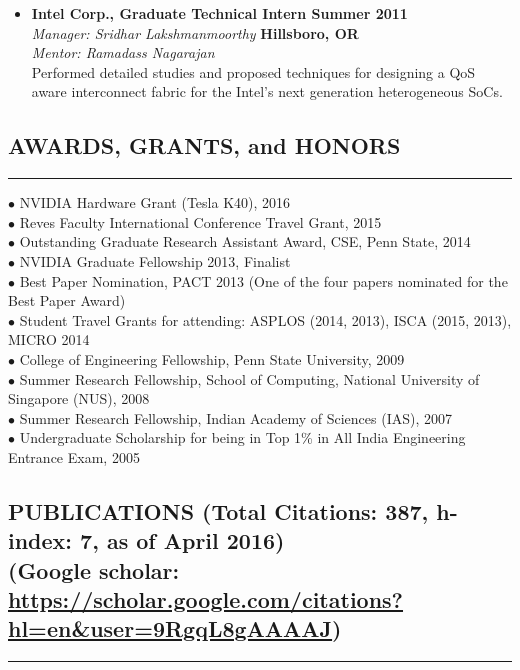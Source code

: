 \documentclass[10pt,a4]{article}
\begin{document}
\begin{itemize}
\item{\bf Intel Corp., Graduate Technical Intern \hfill {\bf Summer 2011}} \\
{\it Manager: Sridhar Lakshmanmoorthy}  \hfill {\bf Hillsboro, OR} \\ 
{\it Mentor: Ramadass Nagarajan}   \\
Performed detailed studies and proposed techniques for designing a QoS aware 
interconnect fabric for the Intel's next generation heterogeneous SoCs. 

\end{itemize}

\subsection*{AWARDS, GRANTS, and HONORS}
\hrule
\vspace{0.2cm}
$\bullet$  NVIDIA Hardware Grant (Tesla K40), 2016 \\
$\bullet$  Reves Faculty International Conference Travel Grant, 2015 \\
$\bullet$  Outstanding Graduate Research Assistant Award, CSE, Penn State, 2014 \\
$\bullet$  NVIDIA Graduate Fellowship 2013, Finalist \\
$\bullet$  Best Paper Nomination, PACT 2013 (One of the four papers nominated for the Best Paper Award) \\
$\bullet$  Student Travel Grants for attending: ASPLOS (2014, 2013), ISCA (2015, 2013), MICRO 2014 \\
$\bullet$  College of Engineering Fellowship, Penn State University, 2009 \\
$\bullet$  Summer Research Fellowship, School of Computing, National University of Singapore (NUS), 2008 \\
$\bullet$  Summer Research Fellowship, Indian Academy of Sciences (IAS), 2007 \\
$\bullet$  Undergraduate Scholarship for being in Top 1\% in All India Engineering Entrance Exam, 2005

\subsection*{PUBLICATIONS (Total Citations: 387, h-index: 7, as of April 2016) \\ (Google scholar: \url{https://scholar.google.com/citations?hl=en&user=9RgqL8gAAAAJ}) }
\hrule
\vspace{0.2cm}
\end{document}
